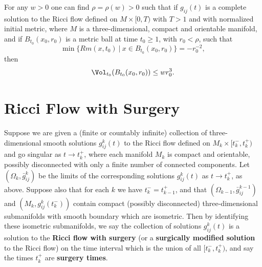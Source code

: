 \begin{corollary}
  \label{cor:cz-small-ball-pseudolocal-curvature-control}

For any $w>0$ one can find $\rho = \rho(w)>0$ such that if
$g_{ij}(t)$ is a complete solution to the Ricci flow defined on
$M\times[0,T)$ with $T>1$ and with normalized initial metric,
where $M$ is a three-dimensional, compact and orientable manifold,
and if $B_{t_0}(x_0,r_0)$ is a metric ball at time $t_0\geq1$,
with $r_0<\rho$, such that$$\min\{ Rm(x,t_0)\ |\ x\in
B_{t_0}(x_0,r_0)\}=-r_0^{-2},$$ then
$$
\Vol_{t_0}(B_{t_0}(x_0,r_0))\leq wr_0^3.
$$
\end{corollary}
\section{Ricci Flow with Surgery}
\begin{definition}
  \label{def:cz-ricci-flow-with-surgery}

Suppose we are given a (finite or countably infinite) collection
of three-dimensional smooth solutions $g^k_{ij}(t)$ to the Ricci
flow defined on $M_k\times [t^-_k,t^+_k)$ and go singular as
$t\rightarrow t^+_k$, where each manifold $M_k$ is compact and
orientable, possibly disconnected with only a finite number of
connected components. Let $(\Omega_k,\bar{g}^k_{ij})$ be the
limits of the corresponding solutions $g^k_{ij}(t)$ as
$t\rightarrow t^+_k$, as above. Suppose also that for each $k$ we
have $t^-_k=t^+_{k-1}$, and that
$(\Omega_{k-1},\bar{g}^{k-1}_{ij})$ and $(M_k,g^k_{ij}(t^-_k))$
contain compact (possibly disconnected) three-dimensional
submanifolds with smooth boundary which are isometric. Then by
identifying these isometric submanifolds, we say the collection of
solutions $g^k_{ij}(t)$ is a solution to the \textbf{Ricci flow
with surgery} (or a
\textbf{surgically modified solution} to the Ricci flow)
 on the time interval which is
the union of all $[t^-_k,t^+_k)$, and say the times $t^+_k$ are
\textbf{surgery
times}. %
\end{definition}
